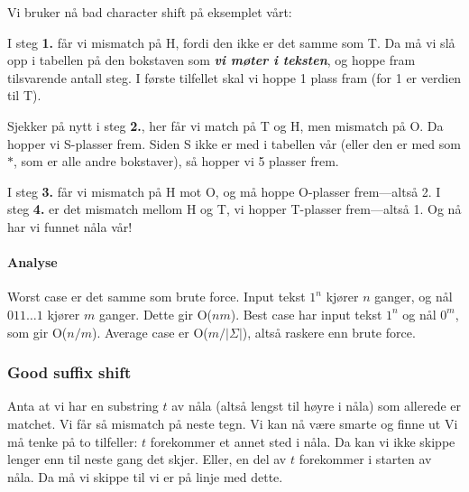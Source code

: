 Vi bruker nå bad character shift på eksemplet vårt: \newline
{}

I steg \textbf{1.} får vi mismatch på H, fordi den ikke er det samme som T. Da må vi slå opp i tabellen på den bokstaven som \textbf{\textit{vi møter i teksten}}, og hoppe fram tilsvarende antall steg. I første tilfellet skal vi hoppe 1 plass fram (for 1 er verdien til T). 

Sjekker på nytt i steg \textbf{2.}, her får vi match på T og H, men mismatch på O. Da hopper vi S-plasser frem. Siden S ikke er med i tabellen vår (eller den er med som $*$, som er alle andre bokstaver), så hopper vi 5 plasser frem.

I steg \textbf{3.} får vi mismatch på H mot O, og må hoppe O-plasser frem---altså 2. I steg \textbf{4.} er det mismatch mellom H og T, vi hopper T-plasser frem---altså 1. Og nå har vi funnet nåla vår!

\paragraph{Analyse}
Worst case er det samme som brute force. Input tekst $1^n$ kjører $n$ ganger, og nål $011\dots1$ kjører $m$ ganger. Dette gir O($nm$). Best case har input tekst $1^n$ og nål $0^m$, som gir O($n/m$). Average case er O($m/|\Sigma|$), altså raskere enn brute force.
	
	\subsubsection{Good suffix shift}
		Anta at vi har en substring $t$ av nåla (altså lengst til høyre i nåla) som allerede er matchet. Vi får så mismatch på neste tegn. Vi kan nå være smarte og finne ut
		Vi må tenke på to tilfeller: $t$ forekommer et annet sted i nåla. Da kan vi ikke skippe lenger enn til neste gang det skjer. Eller, en del av $t$ forekommer i starten av nåla. Da må vi skippe til vi er på linje med dette.
	
